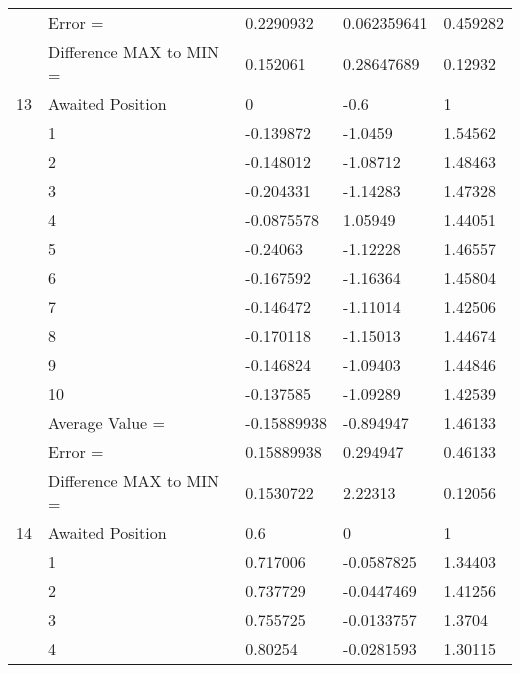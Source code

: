 \begin{tabular}{|p{2cm}|p{3cm}|p{3cm}|p{3cm}|p{3cm}|}
             & Error =                 & 0.2290932    & 0.062359641  & 0.459282   \\
             & Difference MAX to MIN = & 0.152061     & 0.28647689   & 0.12932    \\
\hline
13           & Awaited Position        & 0            & -0.6         & 1          \\
             & 1                       & -0.139872    & -1.0459      & 1.54562    \\
             & 2                       & -0.148012    & -1.08712     & 1.48463    \\
             & 3                       & -0.204331    & -1.14283     & 1.47328    \\
             & 4                       & -0.0875578   & 1.05949      & 1.44051    \\
             & 5                       & -0.24063     & -1.12228     & 1.46557    \\
             & 6                       & -0.167592    & -1.16364     & 1.45804    \\
             & 7                       & -0.146472    & -1.11014     & 1.42506    \\
             & 8                       & -0.170118    & -1.15013     & 1.44674    \\
             & 9                       & -0.146824    & -1.09403     & 1.44846    \\
             & 10                      & -0.137585    & -1.09289     & 1.42539    \\
             & Average Value =         & -0.15889938  & -0.894947    & 1.46133    \\
             & Error =                 & 0.15889938   & 0.294947     & 0.46133    \\
             & Difference MAX to MIN = & 0.1530722    & 2.22313      & 0.12056    \\
\hline
14           & Awaited Position        & 0.6          & 0            & 1          \\
             & 1                       & 0.717006     & -0.0587825   & 1.34403    \\
             & 2                       & 0.737729     & -0.0447469   & 1.41256    \\
             & 3                       & 0.755725     & -0.0133757   & 1.3704     \\
             & 4                       & 0.80254      & -0.0281593   & 1.30115    \\

\end{tabular}

